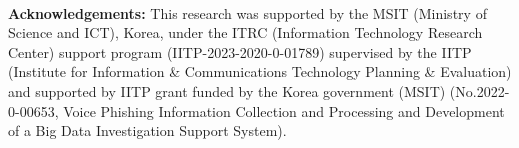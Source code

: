 \documentclass{article}
\begin{document}
\noindent \\ \textbf{Acknowledgements:}
This research was supported by the MSIT (Ministry of Science and ICT), Korea, under the ITRC (Information Technology Research Center) support program (IITP-2023-2020-0-01789) supervised by the IITP (Institute for Information \& Communications Technology Planning \& Evaluation) and supported by IITP grant funded by the Korea government (MSIT) (No.2022-0-00653, Voice Phishing Information Collection and Processing and Development of a Big Data Investigation Support System).







\end{document}
